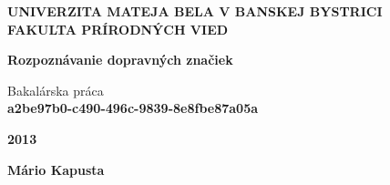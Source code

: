 \documentclass[12pt]{article}
\begin{document}
\begin{titlepage}

\begin{center}

\begin{spacing}{1.5}
{\Large \bfseries UNIVERZITA MATEJA BELA V BANSKEJ BYSTRICI\\
FAKULTA PRÍRODNÝCH VIED}\\[9cm]
\end{spacing}

\begin{spacing}{1.5} 
{\Large \bfseries Rozpoznávanie dopravných značiek}\\
\end{spacing}

{\large Bakalárska práca}\\
\bfseries a2be97b0-c490-496c-9839-8e8fbe87a05a\\[5cm]
\end{center}

\vfill

\begin{minipage}{0.5\textwidth}
\begin{flushleft}
\textbf{2013}
\end{flushleft}
\end{minipage}
\begin{minipage}{0.5\textwidth}
\begin{flushright}
\textbf{Mário Kapusta}
\end{flushright}
\end{minipage}

\end{titlepage}

\thispagestyle{empty}
\end{document}
